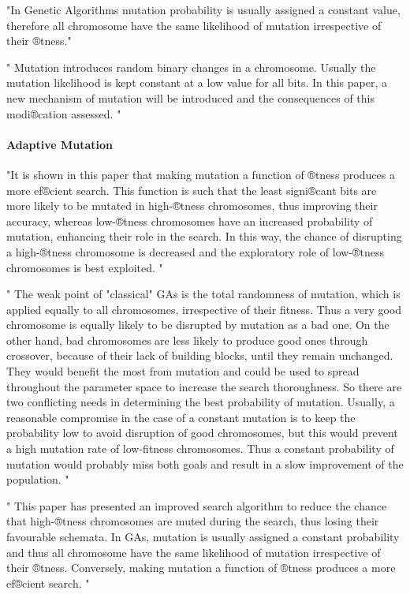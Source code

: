 "In Genetic Algorithms mutation probability is usually assigned a constant value, therefore all chromosome have the same likelihood of mutation irrespective of their ®tness."\cite{marsili_libelli_adaptive_2000}

"
Mutation introduces random binary changes in a chromosome. Usually the mutation likelihood is kept constant at a low value for all bits. In this paper, a new mechanism of mutation will be introduced and the consequences of this modi®cation assessed.
"\cite{marsili_libelli_adaptive_2000}
\paragraph{Adaptive Mutation}
"It is shown in this paper that making mutation a function of ®tness produces a more ef®cient search. This function is such that the least signi®cant bits are more likely to be mutated in high-®tness chromosomes, thus improving their accuracy, whereas low-®tness chromosomes have an increased probability of mutation, enhancing their role in the search. In this way, the chance of disrupting a high-®tness chromosome is decreased and the exploratory role of low-®tness chromosomes is best exploited.
"
\cite{marsili_libelli_adaptive_2000}

"
The weak point of "classical" GAs is the total randomness of mutation, which is applied equally to all chromosomes, irrespective of their fitness. Thus a very good chromosome is equally likely to be disrupted by mutation as a bad one. On the other hand, bad chromosomes are less likely to produce good ones through crossover, because of their lack of building blocks, until they remain unchanged. They would benefit the most from mutation and could be used to spread throughout the parameter space to increase the search thoroughness. So there are two conflicting needs in determining the best probability of mutation. Usually, a reasonable compromise in the case of a constant mutation is to keep the probability low to avoid disruption of good chromosomes, but this would prevent a high mutation rate of low-fitness chromosomes. Thus a constant probability of mutation would probably miss both goals and result in a slow improvement of the population.
"\cite{marsili_libelli_adaptive_2000}


"
This paper has presented an improved search algorithm to reduce the chance that high-®tness chromosomes are muted during the search, thus losing their favourable schemata. In GAs, mutation is usually assigned a constant probability and thus all chromosome have the same likelihood of mutation irrespective of their ®tness. Conversely, making mutation a function of ®tness produces a more ef®cient search.
"\cite{marsili_libelli_adaptive_2000}

